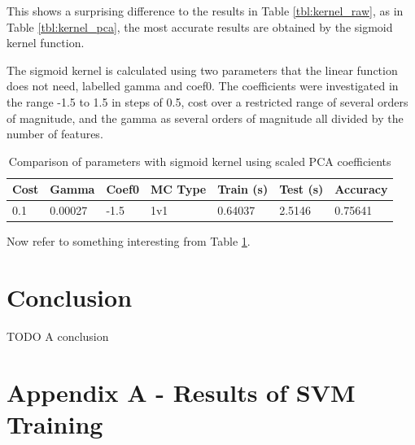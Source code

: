 \documentclass[a4paper, 10pt, conference]{ieeeconf}
\begin{document}
This shows a surprising difference to the results in Table \ref{tbl:kernel_raw}, as in Table \ref{tbl:kernel_pca}, the most accurate results are obtained by the sigmoid kernel function.

The sigmoid kernel is calculated using two parameters that the linear function does not need, labelled gamma and coef0. The coefficients were investigated in the range -1.5 to 1.5 in steps of 0.5, cost over a restricted range of several orders of magnitude, and the gamma as several orders of magnitude all divided by the number of features.


\begin{table}
\centering
\label{tbl:sigmoid_params}
\caption{Comparison of parameters with sigmoid kernel using scaled PCA coefficients}
\begin{tabular}{lllllll}
Cost & Gamma & Coef0 & MC Type & Train (s) & Test (s) & Accuracy\\ \hline
0.1 & 0.00027 & -1.5 & 1v1 & 0.64037 & 2.5146 & 0.75641\\ \hline
\end{tabular}
\end{table}

Now refer to something interesting from Table \ref{tbl:sigmoid_params}.


\section{Conclusion}

TODO A conclusion \cite{infrared}






\clearpage
\onecolumn
\section{Appendix A - Results of SVM Training}
\end{document}
